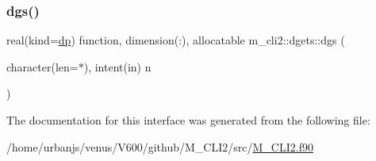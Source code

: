 \subsubsection{\texorpdfstring{dgs()}{dgs()}}
{\footnotesize\ttfamily real(kind=\mbox{\hyperlink{namespacem__cli2_acf83f1963cf6a56ad0221cfcf5402440}{dp}}) function, dimension(\+:), allocatable m\+\_\+cli2\+::dgets\+::dgs (\begin{DoxyParamCaption}\item[{character(len=$\ast$), intent(in)}]{n }\end{DoxyParamCaption})\hspace{0.3cm}{\ttfamily [private]}}



The documentation for this interface was generated from the following file\+:\begin{DoxyCompactItemize}
\item 
/home/urbanjs/venus/\+V600/github/\+M\+\_\+\+C\+L\+I2/src/\mbox{\hyperlink{M__CLI2_8f90}{M\+\_\+\+C\+L\+I2.\+f90}}\end{DoxyCompactItemize}
